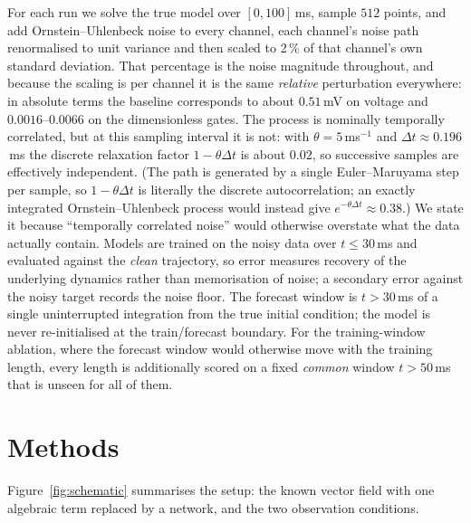 \documentclass{article}
\newcommand{\Tfull}{100}       %
\newcommand{\Ttrain}{30}       %
\newcommand{\Tcommon}{50}      %
\newcommand{\Ndata}{512}       %
\newcommand{\mOUth}{5}\newcommand{\mOUsig}{0.5}
\newcommand{\NoisePct}{2}      %
\newcommand{\sigmaV}{0.51}          %
\newcommand{\sigmaGateLo}{0.0016}   %
\newcommand{\sigmaGateHi}{0.0066}   %
\newcommand{\dtSample}{0.196}       %
\newcommand{\ouAR}{0.02}            %
\begin{document}
For each run we solve the true model over $[0,\Tfull]$\,ms, sample $\Ndata$
points, and add Ornstein--Uhlenbeck noise to every channel, each channel's noise
path renormalised to unit variance and then scaled to \NoisePct\,\% of that
channel's own standard deviation. That percentage is the noise magnitude
throughout, and because the scaling is per channel it is the same \emph{relative}
perturbation everywhere: in absolute terms the baseline corresponds to about
$\sigmaV$\,mV on voltage and $\sigmaGateLo$--$\sigmaGateHi$ on the dimensionless
gates.
The process is nominally temporally correlated, but at this sampling interval it
is not: with $\theta=\mOUth$\,ms$^{-1}$ and $\Delta t \approx \dtSample$\,ms the
discrete relaxation factor $1-\theta\Delta t$ is about $\ouAR$, so successive
samples are effectively independent. (The path is generated by a single
Euler--Maruyama step per sample, so $1-\theta\Delta t$ is literally the discrete
autocorrelation; an exactly integrated Ornstein--Uhlenbeck process would instead
give $e^{-\theta\Delta t}\approx0.38$.) %
We state it because ``temporally correlated noise'' would
otherwise overstate what the data actually contain. Models are trained on the noisy
data over $t\le\Ttrain$\,ms and evaluated against the \emph{clean} trajectory, so
error measures recovery of the underlying dynamics rather than memorisation of
noise; a secondary error against the noisy target records the noise floor. The
forecast window is $t>\Ttrain$\,ms of a single uninterrupted integration from the
true initial condition; the model is never re-initialised at the train/forecast
boundary. For the training-window ablation, where the forecast window would
otherwise move with the training length, every length is additionally scored on a
fixed \emph{common} window $t>\Tcommon$\,ms that is unseen for all of them.

\section{Methods}
\label{sec:methods}

Figure~\ref{fig:schematic} summarises the setup: the known vector field with one
algebraic term replaced by a network, and the two observation conditions.
\end{document}
